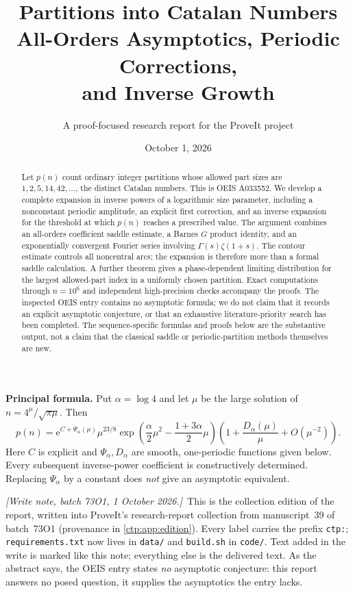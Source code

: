 \documentclass[11pt,a4paper]{article}
\title{\vspace{-1.1cm}\textbf{Partitions into Catalan Numbers}\\[5pt]
\Large All-Orders Asymptotics, Periodic Corrections,\\ and Inverse Growth}
\author{A proof-focused research report for the ProveIt project}
\date{October 1, 2026}
\numberwithin{equation}{section}
\theoremstyle{definition}
\theoremstyle{remark}
\newcommand{\e}{\mathrm e}
\newcommand{\writenote}[1]{\par\smallskip\noindent
 \textit{[Write note, batch 73O1, 1 October 2026.]}\ #1\par\smallskip}
\begin{document}
\maketitle
\thispagestyle{empty}
\begin{abstract}
Let $p(n)$ count ordinary integer partitions whose allowed part sizes are
$1,2,5,14,42,\ldots$, the distinct Catalan numbers. This is OEIS A033552.
We develop a complete expansion in inverse powers of a logarithmic size
parameter, including a nonconstant periodic amplitude, an explicit first
correction, and an inverse expansion for the threshold at which $p(n)$ reaches
a prescribed value. The argument combines an all-orders coefficient saddle
estimate, a Barnes $G$ product identity, and an exponentially convergent
Fourier series involving $\Gamma(s)\zeta(1+s)$. The contour estimate controls
all noncentral arcs; the expansion is therefore more than a formal saddle
calculation. A further theorem gives a phase-dependent limiting distribution
for the largest allowed-part index in a uniformly chosen partition.
Exact computations through $n=10^6$ and independent high-precision checks
accompany the proofs. The inspected OEIS entry contains no asymptotic formula;
we do not claim that it records an explicit asymptotic conjecture, or that an
exhaustive literature-priority search has been completed. The sequence-specific
formulas and proofs below are the substantive output, not a claim that the
classical saddle or periodic-partition methods themselves are new.
\end{abstract}

\begin{resultbox}
\textbf{Principal formula.} Put $\alpha=\log 4$ and let $\mu$ be the large
solution of $n=4^\mu/\sqrt{\pi\mu}$. Then
\[
 p(n)=\e^{C+\Psi_\alpha(\mu)}\mu^{23/8}
 \exp\!\left(\frac\alpha2\mu^2-\frac{1+3\alpha}{2}\mu\right)
 \left(1+\frac{D_\alpha(\mu)}\mu+O(\mu^{-2})\right).
\]
Here $C$ is explicit and $\Psi_\alpha,D_\alpha$ are smooth, one-periodic
functions given below. Every subsequent inverse-power coefficient is
constructively determined. Replacing $\Psi_\alpha$ by a constant does
\emph{not} give an asymptotic equivalent.
\end{resultbox}

\writenote{This is the collection edition of the report, written into
ProveIt's research-report collection from manuscript~39 of batch~73O1
(provenance in \cref{ctp:app:edition}). Every label carries the prefix
\texttt{ctp:}; \texttt{requirements.txt} now lives in \texttt{data/} and
\texttt{build.sh} in \texttt{code/}. Text added in the write is marked like
this note; everything else is the delivered text. As the abstract says,
the OEIS entry states \emph{no} asymptotic conjecture: this report
answers no posed question, it supplies the asymptotics the entry lacks.}
\end{document}

